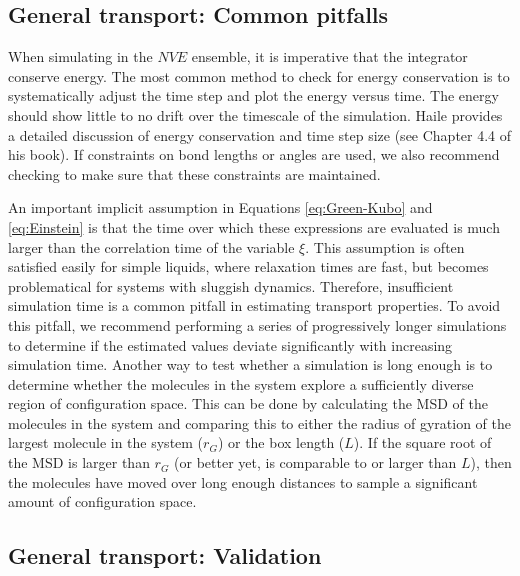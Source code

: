 \documentclass[9pt,bestpractices]{livecoms}
\begin{document}
\subsection{General transport: Common pitfalls} \label{sec:General: Common pitfalls}

When simulating in the $NVE$ ensemble, it is imperative that the integrator conserve energy. The most common method to check for energy conservation is to systematically adjust the time step and plot the energy versus time. The energy should show little to no drift over the timescale of the simulation. Haile \cite{Haile1992} provides a detailed discussion of energy conservation and time step size (see Chapter 4.4 of his book). If constraints on bond lengths or angles are used, we also recommend checking to make sure that these constraints are maintained.


An important implicit assumption in Equations \ref{eq:Green-Kubo} and \ref{eq:Einstein} is that the time over which these expressions are evaluated is much larger than the correlation time of the variable $\xi$. This assumption is often satisfied easily for simple liquids, where relaxation times are fast, but becomes problematical for systems with sluggish dynamics. Therefore, insufficient simulation time is a common pitfall in estimating transport properties. To avoid this pitfall, we recommend performing a series of progressively longer simulations to determine if the estimated values deviate significantly with increasing simulation time. Another way to test whether a simulation is long enough is to determine whether the molecules in the system explore a sufficiently diverse region of configuration space. This can be done by calculating the MSD of the molecules in the system and comparing this to either the radius of gyration of the largest molecule in the system ($r_G$) or the box length ($L$). If the square root of the MSD is larger than $r_G$ (or better yet, is comparable to or larger than $L$), then the molecules have moved over long enough distances to sample a significant amount of configuration space.


\subsection{General transport: Validation} \label{sec:General: Validation}
\end{document}
